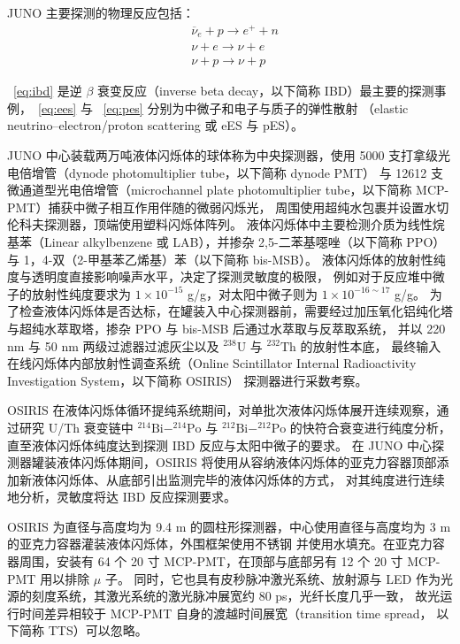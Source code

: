 JUNO 主要探测的物理反应包括：
\begin{align}
    &\overline{\nu}_e+p\rightarrow e^++n \label{eq:ibd}\\
    &\nu+e\rightarrow\nu+e \label{eq:ees}\\
    &\nu+p\rightarrow\nu+p \label{eq:pes}
\end{align}

~\eqref{eq:ibd} 是逆 $\beta$ 衰变反应（inverse beta decay，以下简称 IBD）最主要的探测事例，~\eqref{eq:ees} 与 ~\eqref{eq:pes} 分别为中微子和电子与质子的弹性散射
（elastic neutrino–electron/proton scattering 或 eES 与 pES）。

JUNO 中心装载两万吨液体闪烁体的球体称为中央探测器，使用 5000 支打拿级光电倍增管（dynode photomultiplier tube，以下简称 dynode PMT）
与 12612 支微通道型光电倍增管（microchannel plate photomultiplier tube，以下简称 MCP-PMT）捕获中微子相互作用伴随的微弱闪烁光，
周围使用超纯水包裹并设置水切伦科夫探测器，顶端使用塑料闪烁体阵列。
液体闪烁体中主要检测介质为线性烷基苯（Linear alkylbenzene 或 LAB），并掺杂
2,5-二苯基噁唑（以下简称 PPO）与 1，4-双（2-甲基苯乙烯基）苯（以下简称 bis-MSB）。
液体闪烁体的放射性纯度与透明度直接影响噪声水平，决定了探测灵敏度的极限，
例如对于反应堆中微子的放射性纯度要求为 $1\times10^{-15}$ g/g，对太阳中微子则为 $1\times10^{-16\sim17}$ g/g。
为了检查液体闪烁体是否达标，在罐装入中心探测器前，需要经过加压氧化铝纯化塔与超纯水萃取塔，掺杂 PPO 与 bis-MSB 后通过水萃取与反萃取系统，
并以 220 nm 与 50 nm 两级过滤器过滤灰尘以及 $^{238}\text{U}$ 与 $^{232}\text{Th}$ 的放射性本底，
最终输入在线闪烁体内部放射性调查系统（Online Scintillator Internal Radioactivity Investigation System，以下简称 OSIRIS）
探测器\cite{junocollaborationDesignSensitivityJUNO2021}进行采数考察。

OSIRIS 在液体闪烁体循环提纯系统期间，对单批次液体闪烁体展开连续观察，通过研究 U/Th 衰变链中 $^{214}\text{Bi}-^{214}\text{Po}$ 与 
$^{212}\text{Bi}-^{212}\text{Po}$ 的快符合衰变进行纯度分析，直至液体闪烁体纯度达到探测 IBD 反应与太阳中微子的要求。
在 JUNO 中心探测器罐装液体闪烁体期间，OSIRIS 将使用从容纳液体闪烁体的亚克力容器顶部添加新液体闪烁体、从底部引出监测完毕的液体闪烁体的方式，
对其纯度进行连续地分析，灵敏度将达 IBD 反应探测要求。

OSIRIS 为直径与高度均为 9.4 m 的圆柱形探测器，中心使用直径与高度均为 3 m 的亚克力容器灌装液体闪烁体，外围框架使用不锈钢
并使用水填充。在亚克力容器周围，安装有 64 个 20 寸 MCP-PMT，在顶部与底部另有 12 个 20 寸 MCP-PMT 用以排除 $\mu$ 子。
同时，它也具有皮秒脉冲激光系统、放射源与 LED 作为光源的刻度系统，其激光系统的激光脉冲展宽约 80 ps，光纤长度几乎一致，
故光运行时间差异相较于 MCP-PMT 自身的渡越时间展宽（transition time spread， 以下简称 TTS）可以忽略。

